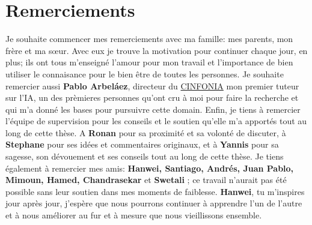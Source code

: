 \chapter*{Remerciements}
\noindent Je souhaite commencer mes remerciements avec ma famille: mes parents, mon frère et ma s\oe ur. Avec 
eux je trouve la motivation pour continuer chaque jour, en plus; ils ont tous m'enseigné l'amour pour 
mon travail et l'importance de bien utiliser le connaisance pour le bien être de toutes les personnes. 
Je souhaite remercier aussi \textbf{Pablo Arbeláez}, directeur du \href{https://cinfonia.uniandes.edu.co/}{CINFONIA} 
mon premier tuteur sur l'IA, un des prèmieres personnes qu'ont cru à moi pour faire la recherche et qui m'a 
donné les bases pour pursuivre cette domain. Enfin, je tiens à remercier l'équipe de supervision pour les 
conseils et le soutien qu'elle m'a apportés tout au long de cette thèse. A \textbf{Ronan} pour sa proximité et 
sa volonté de discuter, à \textbf{Stephane} pour ses idées et commentaires originaux, et à \textbf{Yannis} pour sa sagesse, 
son dévouement et ses conseils tout au long de cette thèse. Je tiens également à remercier mes amis: \textbf{Hanwei, 
Santiago, Andrés, Juan Pablo, Mimoun, Hamed, Chandrasekar} et \textbf{Swetali} ; ce travail n'aurait pas été possible 
sans leur soutien dans mes moments de faiblesse. \textbf{Hanwei}, tu m'inspires jour après jour, j'espère que nous 
pourrons continuer à apprendre l'un de l'autre et à nous améliorer au fur et à mesure que nous vieillissons ensemble.

